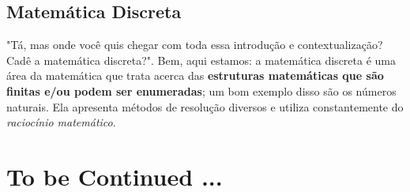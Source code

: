 \documentclass{article}
\begin{document}
\subsection{Matemática Discreta}
"Tá, mas onde você quis chegar com toda essa introdução e contextualização? Cadê a matemática discreta?". Bem, aqui estamos: a matemática discreta é uma área da matemática que trata acerca das \textbf{estruturas matemáticas que são finitas e/ou podem ser enumeradas}; um bom exemplo disso são os números naturais. Ela apresenta métodos de resolução diversos e utiliza constantemente do \emph{raciocínio matemático}.

\section{To be Continued ...}
\end{document}
